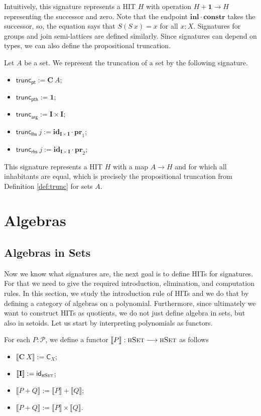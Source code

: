 \documentclass[9pt]{entcs}
\newcommand{\type}[1]{\textsc{#1}}
\newcommand{\constructor}[1]{\mathbf{#1}}
\newcommand{\functortxt}[1]{\mathsf{#1}}
\newcommand{\function}[1]{\mathsf{#1}}
\newcommand{\hset}{\type{hSet}} %
\newcommand{\0}{\textbf{0}} %
\newcommand{\unitt}{\textbf{1}} %
\newcommand{\Def}{:=} %
\newcommand{\functor}[2]{#1 \longrightarrow #2} %
\newcommand{\idf}[1]{\functortxt{id}_{#1}} %
\newcommand{\Cf}[1]{\functortxt{C}_{#1}} %
\newcommand{\prodf}[2]{#1 \times #2} %
\newcommand{\sumf}[2]{#1 + #2} %
\newcommand{\poly}{\mathcal{P}} %
\newcommand{\C}{\constructor{C}} %
\newcommand{\I}{\constructor{I}} %
\newcommand{\sumP}[2]{#1 + #2} %
\newcommand{\prodP}[2]{#1 \times #2} %
\newcommand{\id}[1]{\constructor{id}_{#1}} %
\newcommand{\comp}[2]{#1 \cdot #2} %
\newcommand{\inle}{\constructor{inl}} %
\newcommand{\prle}{\constructor{pr}_1} %
\newcommand{\prre}{\constructor{pr}_2} %
\newcommand{\constr}{\constructor{constr}} %
\newcommand{\pt}[0]{\textsf{pt}}
\newcommand{\pthI}[0]{\textsf{pth}}
\newcommand{\pthA}[0]{\textsf{arg}}
\newcommand{\pthlh}[0]{\textsf{lhs}}
\newcommand{\pthrh}[0]{\textsf{rhs}}
\newcommand{\pointc}[1]{#1_{\pt}} %
\newcommand{\pathI}[1]{#1_{\pthI}} %
\newcommand{\pathA}[1]{#1_{\pthA}} %
\newcommand{\pathlh}[1]{#1_{\pthlh}} %
\newcommand{\pathrh}[1]{#1_{\pthrh}} %
\newcommand{\trunc}{\function{trunc}} %
\newcommand{\semP}[1]{\llbracket #1 \rrbracket} %
\begin{document}
Intuitively, this signature represents a HIT $H$ with operation $H + \unitt \rightarrow H$ representing the successor and zero.
Note that the endpoint $\comp{\inle}{\constr}$ takes the successor, so, the equation says that $S(S \> x) = x$ for all $x : X$.
Signatures for groups and join semi-lattices are defined similarly.
Since signatures can depend on types, we can also define the propositional truncation.

\begin{example}
\label{ex:truncsig}
Let $A$ be a set.
We represent the truncation of a set by the following signature.
\begin{itemize}
	\item $\pointc{\trunc} \Def \C \> A$;
	\item $\pathI{\trunc} \Def \unitt$;
	\item $\pathA{\trunc} \Def \prodP{\I}{\I}$;
	\item $\pathlh{\trunc} \> j \Def \comp{\id{\prodP{\I}{\I}}}{\prle}$;
	\item $\pathrh{\trunc} \> j \Def \comp{\id{\prodP{\I}{\I}}}{\prre}$;
\end{itemize}
\end{example}

This signature represents a HIT $H$ with a map $A \rightarrow H$ and for which all inhabitants are equal, which is precisely the propositional truncation from Definition \ref{def:trunc} for sets $A$.

\section{Algebras}
\label{sec:algebras}

\subsection{Algebras in Sets}
Now we know what signatures are, the next goal is to define HITs for signatures.
For that we need to give the required introduction, elimination, and computation rules.
In this section, we study the introduction rule of HITs and we do that by defining a category of algebras on a polynomial.
Furthermore, since ultimately we want to construct HITs as quotients, we do not just define algebra in sets, but also in setoids.
Let us start by interpreting polynomials as functors.

\begin{definition}
\label{def:sempoly}
For each $P : \poly$, we define a functor $\semP{P} : \functor{\hset}{\hset}$ as follows
\begin{itemize}
	\item $\semP{\C \> X} \Def \Cf{X}$;
	\item $\semP{\I} \Def \idf{\hset}$;
	\item $\semP{\sumP{P}{Q}} \Def \sumf{\semP{P}}{\semP{Q}}$;
	\item $\semP{\sumP{P}{Q}} \Def \prodf{\semP{P}}{\semP{Q}}$.
\end{itemize}
\end{definition}
\end{document}
